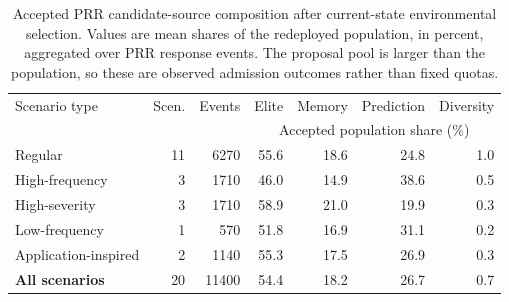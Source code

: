 \begin{table}[htbp]
\centering
\caption{Accepted PRR candidate-source composition after current-state environmental selection. Values are mean shares of the redeployed population, in percent, aggregated over PRR response events. The proposal pool is larger than the population, so these are observed admission outcomes rather than fixed quotas.}
\label{tab:source-acceptance-type}
\scriptsize
\setlength{\tabcolsep}{4pt}
\renewcommand{\arraystretch}{1.12}
\begin{tabular}{lrrrrrr}
\toprule
Scenario type & Scen. & Events & Elite & Memory & Prediction & Diversity \\
 & & & \multicolumn{4}{c}{Accepted population share (\%)} \\
\midrule
Regular & 11 & 6270 & 55.6 & 18.6 & 24.8 & 1.0 \\
High-frequency & 3 & 1710 & 46.0 & 14.9 & 38.6 & 0.5 \\
High-severity & 3 & 1710 & 58.9 & 21.0 & 19.9 & 0.3 \\
Low-frequency & 1 & 570 & 51.8 & 16.9 & 31.1 & 0.2 \\
Application-inspired & 2 & 1140 & 55.3 & 17.5 & 26.9 & 0.3 \\
\midrule
\textbf{All scenarios} & 20 & 11400 & 54.4 & 18.2 & 26.7 & 0.7 \\
\bottomrule
\end{tabular}
\end{table}